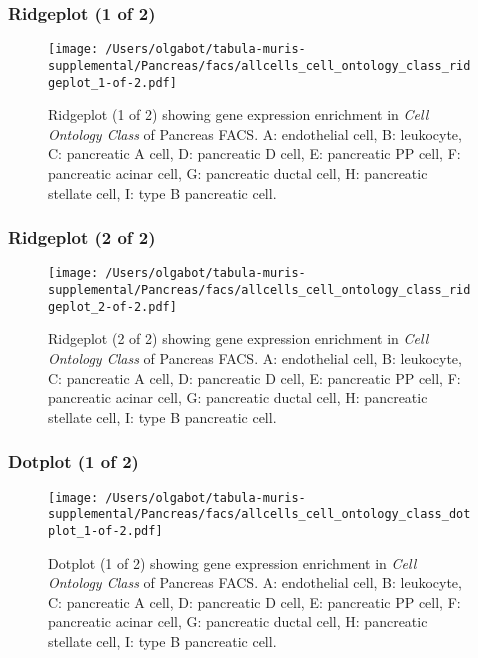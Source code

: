 \clearpage

\subsubsection{Ridgeplot (1 of 2)}
\begin{figure}[h]
\centering
\texttt{[image: /Users/olgabot/tabula-muris-supplemental/Pancreas/facs/allcells\_cell\_ontology\_class\_ridgeplot\_1-of-2.pdf]}

\caption{ Ridgeplot (1 of 2)  showing gene expression enrichment in \emph{Cell Ontology Class} of Pancreas FACS. A: endothelial cell, B: leukocyte, C: pancreatic A cell, D: pancreatic D cell, E: pancreatic PP cell, F: pancreatic acinar cell, G: pancreatic ductal cell, H: pancreatic stellate cell, I: type B pancreatic cell.}
\end{figure}


\clearpage

\subsubsection{Ridgeplot (2 of 2)}
\begin{figure}[h]
\centering
\texttt{[image: /Users/olgabot/tabula-muris-supplemental/Pancreas/facs/allcells\_cell\_ontology\_class\_ridgeplot\_2-of-2.pdf]}

\caption{ Ridgeplot (2 of 2)  showing gene expression enrichment in \emph{Cell Ontology Class} of Pancreas FACS. A: endothelial cell, B: leukocyte, C: pancreatic A cell, D: pancreatic D cell, E: pancreatic PP cell, F: pancreatic acinar cell, G: pancreatic ductal cell, H: pancreatic stellate cell, I: type B pancreatic cell.}
\end{figure}


\clearpage

\subsubsection{Dotplot (1 of 2)}
\begin{figure}[h]
\centering
\texttt{[image: /Users/olgabot/tabula-muris-supplemental/Pancreas/facs/allcells\_cell\_ontology\_class\_dotplot\_1-of-2.pdf]}

\caption{ Dotplot (1 of 2)  showing gene expression enrichment in \emph{Cell Ontology Class} of Pancreas FACS. A: endothelial cell, B: leukocyte, C: pancreatic A cell, D: pancreatic D cell, E: pancreatic PP cell, F: pancreatic acinar cell, G: pancreatic ductal cell, H: pancreatic stellate cell, I: type B pancreatic cell.}
\end{figure}


